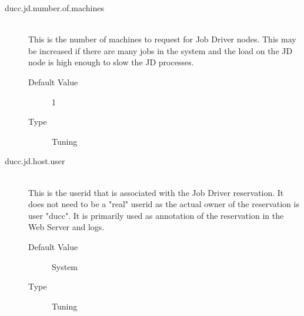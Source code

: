 \begin{description}
        \item[ducc.jd.number.of.machines] \hfill \\
          This is the number of machines to request for Job Driver nodes. This may be increased if 
          there are many jobs in the system and the load on the JD node is high enough to slow the 
          JD processes. 
          \begin{description}
            \item[Default Value] 1 
            \item[Type] Tuning 
          \end{description}
          

        \item[ducc.jd.host.user] \hfill \\
          This is the userid that is associated with the Job Driver reservation. It does not need to be 
          a "real" userid as the actual owner of the reservation is user "ducc". It is primarily used as 
          annotation of the reservation in the Web Server and logs. 
          \begin{description}
            \item[Default Value] System 
            \item[Type] Tuning 
          \end{description}
      \end{description}
      
  



